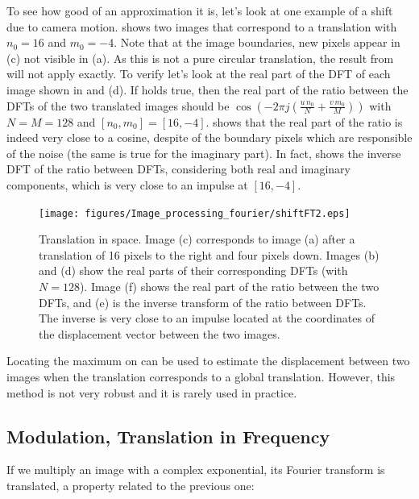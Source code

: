 To see how good of an approximation it is, let's look at one example of a shift due to camera motion. \Fig{\ref{fig:shiftFT}} shows two images that correspond to a translation with $n_0=16$ and $m_0=-4$. Note that at the image boundaries, new pixels appear in (c) not visible in (a). As this is not a pure circular translation, the result from \eqn{\ref{eq:shift}} will not apply exactly. To verify \eqn{\ref{eq:shift}} let's look at the real part of the DFT of each image shown in  and (d). If \eqn{\ref{eq:shift}} holds true, then the real part of the ratio between the DFTs of the two translated images should be $\cos{ \left( -2\pi j \left( \frac{u\, n_0}{N} + \frac{v\, m_0}{M} \right) \right)}$ with $N=M=128$ and $[n_0,m_0]=[16,-4]$.   shows that the real part of the ratio is indeed very close to a cosine, despite of the boundary pixels which are responsible of the noise (the same is true for the imaginary part). In fact,   shows the inverse DFT of the ratio between DFTs, considering both real and imaginary components, which is very close to an impulse at $[16,-4]$.



\begin{figure}[t]
\centerline{
\texttt{[image: figures/Image\_processing\_fourier/shiftFT2.eps]}}
\caption{Translation in space. Image (c) corresponds to image (a) after a translation of 16 pixels to the right and four pixels down. Images (b) and (d) show the real parts of their corresponding DFTs (with $N=128$). Image (f) shows the real part of the ratio between the two DFTs, and (e) is the inverse transform of the ratio between DFTs. The inverse is very close to an impulse located at the coordinates of the displacement vector between the two images.} 
\label{fig:shiftFT}
\end{figure}

Locating the maximum on  can be used to estimate the displacement between two images when the translation corresponds to a global translation. However, this method is not very robust and it is rarely used in practice.


\subsection{Modulation, Translation in Frequency}

If we multiply an image with a complex exponential, its Fourier transform is translated, a property related to the previous one:

